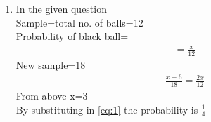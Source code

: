 \renewcommand{\theequation}{\theenumi}
\begin{enumerate}[label=\arabic*.,ref=\thesubsubsection.\theenumi]
\item In the given question
\\
Sample=total no. of balls=12
\\
Probability of black ball=
\begin{align}
\label{eq:1}
=\frac{x}{12}
\end{align}
New sample=18
\\
\begin{align}
\frac{x+6}{18}=\frac{2x}{12}
\end{align}
From above x=3
\\
By substituting in \ref{eq:1} the probability is $\frac{1}{4}$
\end{enumerate}